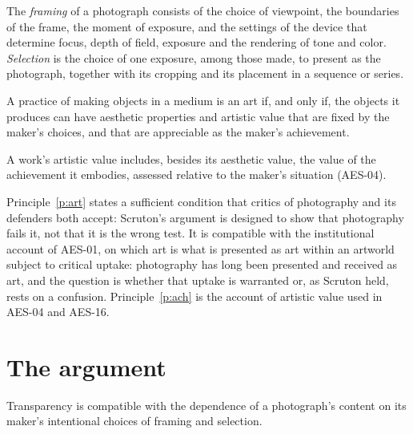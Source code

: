 \documentclass{situationist-preprint}
\begin{document}
\begin{definition}\label{d:choices}
The \emph{framing} of a photograph consists of the choice of viewpoint, the boundaries of the frame, the moment of exposure, and the settings of the device that determine focus, depth of field, exposure and the rendering of tone and color. \emph{Selection} is the choice of one exposure, among those made, to present as the photograph, together with its cropping and its placement in a sequence or series.
\end{definition}

\begin{principle}\label{p:art}
A practice of making objects in a medium is an art if, and only if, the objects it produces can have aesthetic properties and artistic value that are fixed by the maker's choices, and that are appreciable as the maker's achievement.
\end{principle}

\begin{principle}[Achievement]\label{p:ach}
A work's artistic value includes, besides its aesthetic value, the value of the achievement it embodies, assessed relative to the maker's situation (AES-04).
\end{principle}

Principle~\ref{p:art} states a sufficient condition that critics of photography and its defenders both accept: Scruton's argument is designed to show that photography fails it, not that it is the wrong test. It is compatible with the institutional account of AES-01, on which art is what is presented as art within an artworld subject to critical uptake: photography has long been presented and received as art, and the question is whether that uptake is warranted or, as Scruton held, rests on a confusion. Principle~\ref{p:ach} is the account of artistic value used in AES-04 and AES-16.

\section{The argument}

\begin{lemma}\label{l:cond}
Transparency is compatible with the dependence of a photograph's content on its maker's intentional choices of framing and selection.
\end{lemma}
\end{document}
